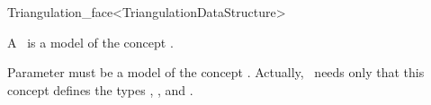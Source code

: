 \begin{ccRefClass}{Triangulation_face<TriangulationDataStructure>}

\ccDefinition

A \ccRefName\ is a model of the concept .

\ccParameters

Parameter  must be a model of the concept
.
Actually, \ccRefName\ needs only that this concept defines the types
,
, and
.


\ccIsModel


\ccSeeAlso

\\

\end{ccRefClass}
